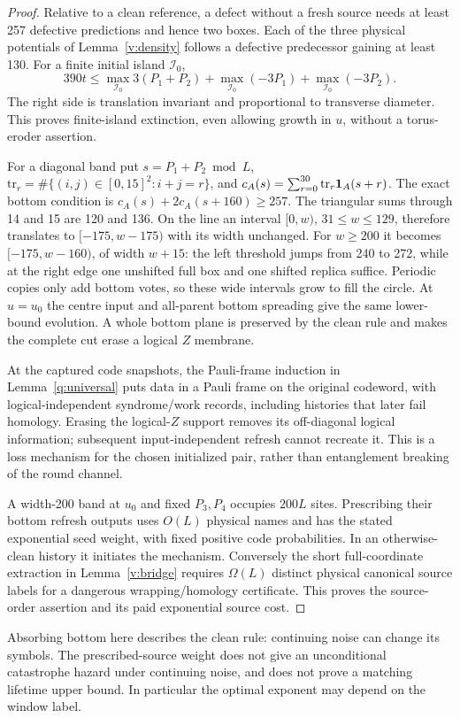 \begin{proof}
Relative to a clean reference, a defect without a fresh source needs
at least 257 defective predictions and hence two boxes. Each of the
three physical potentials of Lemma~\ref{v:density} follows a defective
predecessor gaining at least 130. For a finite initial island \(\mathcal I_0\),
\[
 390t\le\max_{\mathcal I_0}3(P_1+P_2)+\max_{\mathcal I_0}(-3P_1)+\max_{\mathcal I_0}(-3P_2).
\]
The right side is translation invariant and proportional to transverse
diameter. This proves finite-island extinction, even allowing growth
in \(u\), without a torus-eroder assertion.

For a diagonal band put \(s=P_1+P_2\bmod L\),
\(\mathrm{tr}_r=\#\{(i,j)\in[0,15]^2:i+j=r\}\), and
\(c_A(s)=\sum_{r=0}^{30}\mathrm{tr}_r\mathbf 1_A(s+r)\).
The exact bottom condition is
\(c_A(s)+2c_A(s+160)\ge257\). The triangular sums through 14 and
15 are 120 and 136. On the line an interval \([0,w)\),
\(31\le w\le129\), therefore translates to \([-175,w-175)\)
with its width unchanged. For \(w\ge200\) it becomes
\([-175,w-160)\), of width \(w+15\): the left threshold jumps from
240 to 272, while at the right edge one unshifted full box and one
shifted replica suffice. Periodic copies only add bottom votes, so
these wide intervals grow to fill the circle. At \(u=u_0\)
the centre input and all-parent bottom spreading give the same
lower-bound evolution. A whole bottom plane is preserved by the clean
rule and makes the complete cut erase a logical \(Z\) membrane.

At the captured code snapshots, the Pauli-frame induction in
Lemma~\ref{q:universal} puts data in a Pauli frame on the original
codeword, with logical-independent syndrome/work records, including
histories that later fail homology. Erasing the logical-\(Z\) support
removes its off-diagonal logical information; subsequent input-independent
refresh cannot recreate it. This is a loss mechanism for the chosen
initialized pair, rather than entanglement breaking of the round channel.

A width-200 band at \(u_0\) and fixed \(P_3,P_4\) occupies \(200L\)
sites. Prescribing their bottom refresh outputs uses \(O(L)\) physical
names and has the stated exponential seed weight, with fixed positive
code probabilities. In an otherwise-clean history it initiates the
mechanism. Conversely the short full-coordinate extraction in
Lemma~\ref{v:bridge} requires \(\Omega(L)\) distinct physical canonical
source labels for a dangerous wrapping/homology certificate. This proves the
source-order assertion and its paid exponential source cost.
\end{proof}

Absorbing bottom here describes the clean rule: continuing noise can
change its symbols. The prescribed-source weight does not give an
unconditional catastrophe hazard under continuing noise, and does not
prove a matching lifetime upper bound. In particular the optimal
exponent may depend on the window label.
